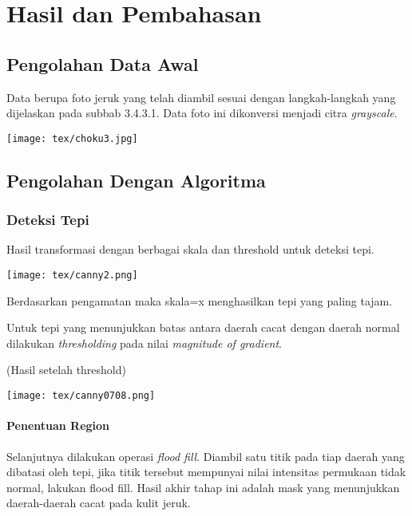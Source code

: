 \documentclass[laporan.tex]{subfiles}
\begin{document}
\chapter{Hasil dan Pembahasan}

\section{Pengolahan Data Awal}

Data berupa foto jeruk yang telah diambil sesuai dengan langkah-langkah yang dijelaskan pada subbab 3.4.3.1. Data foto ini dikonversi menjadi citra \emph{grayscale}.

\texttt{[image: tex/choku3.jpg]}

\section{Pengolahan Dengan Algoritma}

\subsection{Deteksi Tepi}

Hasil transformasi dengan berbagai skala dan threshold untuk deteksi tepi.

\texttt{[image: tex/canny2.png]}

Berdasarkan pengamatan maka skala=x menghasilkan tepi yang paling tajam.

Untuk tepi yang menunjukkan batas antara daerah cacat dengan daerah normal dilakukan \emph{thresholding} pada nilai \emph{magnitude of gradient}.

(Hasil setelah threshold)

\texttt{[image: tex/canny0708.png]}

\subsubsection{Penentuan Region}

Selanjutnya dilakukan operasi \emph{flood fill}. Diambil satu titik pada tiap daerah yang dibatasi oleh tepi, jika titik tersebut mempunyai nilai intensitas permukaan tidak normal, lakukan flood fill. Hasil akhir tahap ini adalah mask yang menunjukkan daerah-daerah cacat pada kulit jeruk.
\end{document}
